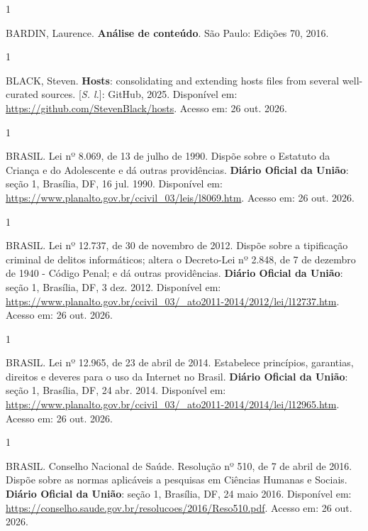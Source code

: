 \documentclass[12pt,a4paper]{article}
\begin{document}
\begin{spacing}{1}\raggedright\noindent BARDIN, Laurence. \textbf{Análise de conteúdo}. São Paulo: Edições 70, 2016.\par\vspace{12pt}\end{spacing}
\begin{spacing}{1}\raggedright\noindent BLACK, Steven. \textbf{Hosts}: consolidating and extending hosts files from several well-curated sources. [\textit{S. l.}]: GitHub, 2025. Disponível em: \url{https://github.com/StevenBlack/hosts}. Acesso em: 26 out. 2026.\par\vspace{12pt}\end{spacing}
\begin{spacing}{1}\raggedright\noindent BRASIL. Lei nº 8.069, de 13 de julho de 1990. Dispõe sobre o Estatuto da Criança e do Adolescente e dá outras providências. \textbf{Diário Oficial da União}: seção 1, Brasília, DF, 16 jul. 1990. Disponível em: \url{https://www.planalto.gov.br/ccivil_03/leis/l8069.htm}. Acesso em: 26 out. 2026.\par\vspace{12pt}\end{spacing}
\begin{spacing}{1}\raggedright\noindent BRASIL. Lei nº 12.737, de 30 de novembro de 2012. Dispõe sobre a tipificação criminal de delitos informáticos; altera o Decreto-Lei nº 2.848, de 7 de dezembro de 1940 - Código Penal; e dá outras providências. \textbf{Diário Oficial da União}: seção 1, Brasília, DF, 3 dez. 2012. Disponível em: \url{https://www.planalto.gov.br/ccivil_03/_ato2011-2014/2012/lei/l12737.htm}. Acesso em: 26 out. 2026.\par\vspace{12pt}\end{spacing}
\begin{spacing}{1}\raggedright\noindent BRASIL. Lei nº 12.965, de 23 de abril de 2014. Estabelece princípios, garantias, direitos e deveres para o uso da Internet no Brasil. \textbf{Diário Oficial da União}: seção 1, Brasília, DF, 24 abr. 2014. Disponível em: \url{https://www.planalto.gov.br/ccivil_03/_ato2011-2014/2014/lei/l12965.htm}. Acesso em: 26 out. 2026.\par\vspace{12pt}\end{spacing}
\begin{spacing}{1}\raggedright\noindent BRASIL. Conselho Nacional de Saúde. Resolução nº 510, de 7 de abril de 2016. Dispõe sobre as normas aplicáveis a pesquisas em Ciências Humanas e Sociais. \textbf{Diário Oficial da União}: seção 1, Brasília, DF, 24 maio 2016. Disponível em: \url{https://conselho.saude.gov.br/resolucoes/2016/Reso510.pdf}. Acesso em: 26 out. 2026.\par\vspace{12pt}\end{spacing}
\end{document}
